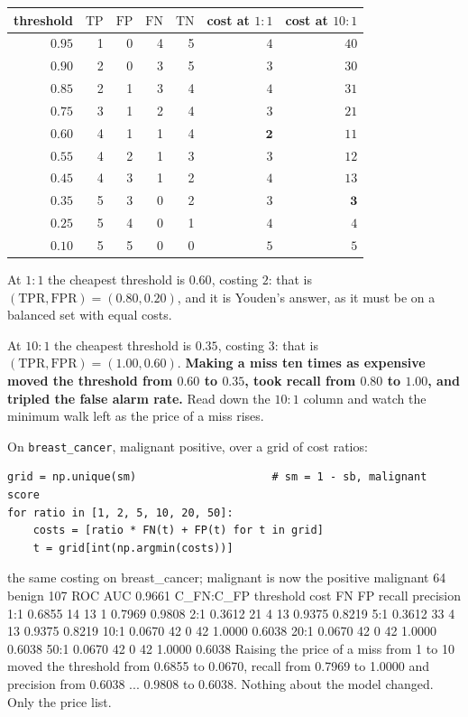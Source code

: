 \documentclass[11pt]{article}
\newcommand{\TP}{\mathrm{TP}}
\newcommand{\FP}{\mathrm{FP}}
\newcommand{\TN}{\mathrm{TN}}
\newcommand{\FN}{\mathrm{FN}}
\newcommand{\TPR}{\mathrm{TPR}}
\newcommand{\FPR}{\mathrm{FPR}}
\begin{document}
\begin{worked}
\begin{center}\small
\begin{tabular}{@{}rrrrrrr@{}}
\toprule
threshold & $\TP$ & $\FP$ & $\FN$ & $\TN$ & cost at $1\!:\!1$ & cost at $10\!:\!1$\\
\midrule
$0.95$ & 1 & 0 & 4 & 5 & $4$ & $40$\\
$0.90$ & 2 & 0 & 3 & 5 & $3$ & $30$\\
$0.85$ & 2 & 1 & 3 & 4 & $4$ & $31$\\
$0.75$ & 3 & 1 & 2 & 4 & $3$ & $21$\\
$\mathbf{0.60}$ & 4 & 1 & 1 & 4 & $\mathbf{2}$ & $11$\\
$0.55$ & 4 & 2 & 1 & 3 & $3$ & $12$\\
$0.45$ & 4 & 3 & 1 & 2 & $4$ & $13$\\
$\mathbf{0.35}$ & 5 & 3 & 0 & 2 & $3$ & $\mathbf{3}$\\
$0.25$ & 5 & 4 & 0 & 1 & $4$ & $4$\\
$0.10$ & 5 & 5 & 0 & 0 & $5$ & $5$\\
\bottomrule
\end{tabular}
\end{center}
At $1\!:\!1$ the cheapest threshold is $0.60$, costing $2$: that is
$(\TPR, \FPR) = (0.80, 0.20)$, and it is Youden's answer, as it must be on a
balanced set with equal costs.

At $10\!:\!1$ the cheapest threshold is $0.35$, costing $3$: that is
$(\TPR, \FPR) = (1.00, 0.60)$. \textbf{Making a miss ten times as expensive moved
the threshold from $0.60$ to $0.35$, took recall from $0.80$ to $1.00$, and
tripled the false alarm rate.} Read down the $10\!:\!1$ column and watch the
minimum walk left as the price of a miss rises.
\end{worked}

On \texttt{breast\_cancer}, malignant positive, over a grid of cost ratios:

\begin{lstlisting}
grid = np.unique(sm)                     # sm = 1 - sb, malignant score
for ratio in [1, 2, 5, 10, 20, 50]:
    costs = [ratio * FN(t) + FP(t) for t in grid]
    t = grid[int(np.argmin(costs))]
\end{lstlisting}
\begin{codeout}
the same costing on breast_cancer; malignant is now the positive
malignant 64   benign 107   ROC AUC 0.9661
C_FN:C_FP   threshold   cost   FN   FP   recall  precision
    1:1       0.6855     14   13    1   0.7969    0.9808
    2:1       0.3612     21    4   13   0.9375    0.8219
    5:1       0.3612     33    4   13   0.9375    0.8219
   10:1       0.0670     42    0   42   1.0000    0.6038
   20:1       0.0670     42    0   42   1.0000    0.6038
   50:1       0.0670     42    0   42   1.0000    0.6038
Raising the price of a miss from 1 to 10 moved the threshold from 0.6855 to 0.0670,
recall from 0.7969 to 1.0000 and precision from 0.6038 ... 0.9808 to 0.6038.
Nothing about the model changed. Only the price list.
\end{codeout}
\end{document}
